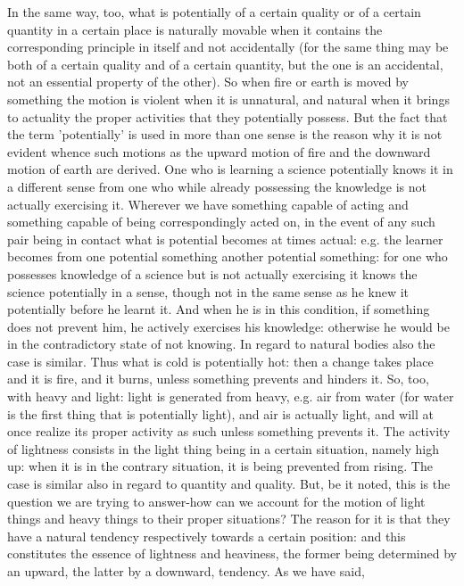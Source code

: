 In the same way, too, what is potentially of a certain quality or
of a certain quantity in a certain place is naturally movable when
it contains the corresponding principle in itself and not accidentally
(for the same thing may be both of a certain quality and of a certain
quantity, but the one is an accidental, not an essential property
of the other). So when fire or earth is moved by something the motion
is violent when it is unnatural, and natural when it brings to actuality
the proper activities that they potentially possess. But the fact
that the term 'potentially' is used in more than one sense is the
reason why it is not evident whence such motions as the upward motion
of fire and the downward motion of earth are derived. One who is learning
a science potentially knows it in a different sense from one who while
already possessing the knowledge is not actually exercising it. Wherever
we have something capable of acting and something capable of being
correspondingly acted on, in the event of any such pair being in contact
what is potential becomes at times actual: e.g. the learner becomes
from one potential something another potential something: for one
who possesses knowledge of a science but is not actually exercising
it knows the science potentially in a sense, though not in the same
sense as he knew it potentially before he learnt it. And when he is
in this condition, if something does not prevent him, he actively
exercises his knowledge: otherwise he would be in the contradictory
state of not knowing. In regard to natural bodies also the case is
similar. Thus what is cold is potentially hot: then a change takes
place and it is fire, and it burns, unless something prevents and
hinders it. So, too, with heavy and light: light is generated from
heavy, e.g. air from water (for water is the first thing that is potentially
light), and air is actually light, and will at once realize its proper
activity as such unless something prevents it. The activity of lightness
consists in the light thing being in a certain situation, namely high
up: when it is in the contrary situation, it is being prevented from
rising. The case is similar also in regard to quantity and quality.
But, be it noted, this is the question we are trying to answer-how
can we account for the motion of light things and heavy things to
their proper situations? The reason for it is that they have a natural
tendency respectively towards a certain position: and this constitutes
the essence of lightness and heaviness, the former being determined
by an upward, the latter by a downward, tendency. As we have said,
